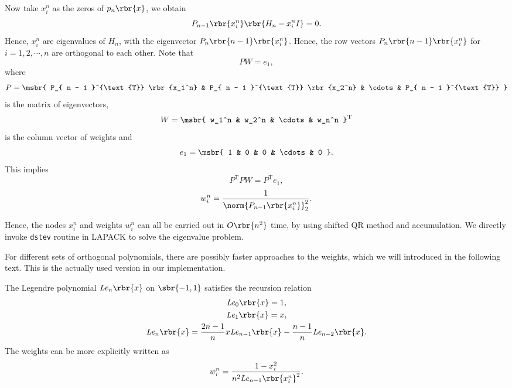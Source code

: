 \documentclass[english, nochinese]{pnote}
\begin{document}
Now take $x_i^n$ as the zeros of $ p_n \rbr{x} $, we obtain
\begin{equation}
P_{ n - 1 } \rbr{x_i^n} \rbr{ H_n - x_i^n I } = 0.
\end{equation}
Hence, $x_i^n$ are eigenvalues of $H_n$, with the eigenvector $ P_n \rbr{ n - 1 } \rbr{x_i^n} $. Hence, the row vectors $ P_n \rbr{ n - 1 } \rbr{x_i^n} $ for $ i = 1, 2, \cdots, n $ are orthogonal to each other.
Note that
\begin{equation}
P W = e_1,
\end{equation}
where
\begin{equation}
P = \msbr{ P_{ n - 1 }^{\text{T}} \rbr{x_1^n} & P_{ n - 1 }^{\text{T}} \rbr{x_2^n} & \cdots & P_{ n - 1 }^{\text{T}} }
\end{equation}
is the matrix of eigenvectors,
\begin{equation}
W = \msbr{ w_1^n & w_2^n & \cdots & w_n^n }^{\text{T}}
\end{equation}
is the column vector of weights and
\begin{equation}
e_1 = \msbr{ 1 & 0 & 0 & \cdots & 0 }.
\end{equation}
This implies
\begin{equation}
P^{\text{T}} P W = P^{\text{T}} e_1,
\end{equation}
\begin{equation}
w_i^n = \frac{1}{\norm{ P_{ n - 1 } \rbr{x_i^n} }_2^2}.
\end{equation}

Hence, the nodes $x_i^n$ and weights $w_i^n$ can all be carried out in $ O \rbr{n^2} $ time, by using shifted QR method and accumulation. We directly invoke \verb"dstev" routine in LAPACK to solve the eigenvalue problem.

For different sets of orthogonal polynomials, there are possibly faster approaches to the weights, which we will introduced in the following text. This is the actually used version in our implementation.

The Legendre polynomial $ \mathit{Le}_n \rbr{x} $ on $ \sbr{ -1, 1 } $ satisfies the recursion relation
\begin{gather}
\mathit{Le}_0 \rbr{x} = 1, \\
\mathit{Le}_1 \rbr{x} = x, \\
\mathit{Le}_n \rbr{x} = \frac{ 2 n - 1 }{n} x \mathit{Le}_{ n - 1 } \rbr{x} - \frac{ n - 1 }{n} \mathit{Le}_{ n - 2 } \rbr{x}.
\end{gather}
The weights can be more explicitly written as
\begin{equation}
w_i^n = \frac{ 1 - x_i^2 }{ n^2 \mathit{Le}_{ n - 1 } \rbr{x_i^n}^2 }.
\end{equation}
\end{document}
